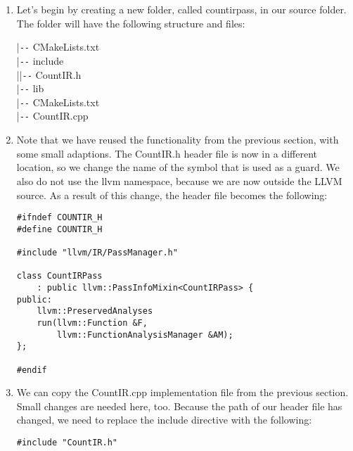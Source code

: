 \begin{enumerate}
\item Let's begin by creating a new folder, called countirpass, in our source folder. The 
folder will have the following structure and files:
\begin{tcolorbox}[colback=white,colframe=black]
|\verb|--| CMakeLists.txt \\
|\verb|--| include \\
|\hspace{1cm}|\verb|--| CountIR.h \\
|\verb|--| lib \\
\hspace*{0.8cm}|\verb|--| CMakeLists.txt \\
\hspace*{0.8cm}|\verb|--| CountIR.cpp
\end{tcolorbox}

\item Note that we have reused the functionality from the previous section, with some small adaptions. The CountIR.h header file is now in a different location, so we change the name of the symbol that is used as a guard. We also do not use the llvm namespace, because we are now outside the LLVM source. As a result of this change, the header file becomes the following:
\begin{lstlisting}[caption={}]
#ifndef COUNTIR_H
#define COUNTIR_H

#include "llvm/IR/PassManager.h"

class CountIRPass
	: public llvm::PassInfoMixin<CountIRPass> {
public:
	llvm::PreservedAnalyses
	run(llvm::Function &F,
		llvm::FunctionAnalysisManager &AM);
};

#endif
\end{lstlisting}

\item We can copy the CountIR.cpp implementation file from the previous section. Small changes are needed here, too. Because the path of our header file has changed, we need to replace the include directive with the following:
\begin{lstlisting}[caption={}]
#include "CountIR.h"
\end{lstlisting}


\end{enumerate}
